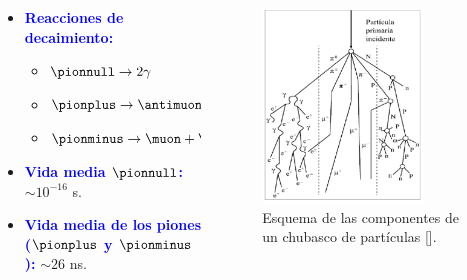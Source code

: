 \begin{frame}{}
\begin{columns}
\begin{column}{0.57\textwidth}
\begin{itemize}
                    \item \textcolor{blue}{\textbf{Reacciones de decaimiento:}}
                    	\begin{itemize}
                            \item $\pionnull \rightarrow 2 \gamma$
                            \item $\pionplus \rightarrow \antimuon + \neutrino$
                            \item $\pionminus \rightarrow \muon + \antineutrino$
                    	\end{itemize}
                    \item \textcolor{blue}{\textbf{\small Vida media $\pionnull$:}} \small $\sim 10^{-16}$ s.
                    \item \textcolor{blue}{\textbf{\small Vida media de los piones ($\pionplus$ y $\pionminus$):}} \small $\sim 26$ ns.
                \end{itemize}
            \end{column}

            \begin{column}{0.5\textwidth} %
                \begin{figure}
                    \centering
                    \includegraphics[width=0.8\textwidth]{Figures/showercomponent.png}
                    \caption{\tiny Esquema de las componentes de un chubasco de partículas [\cite{valdesgalicia1992}].}
                \end{figure}
            \end{column}
        \end{columns}
    \end{frame}     

